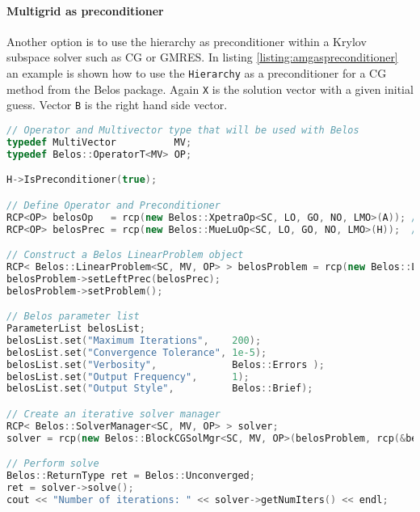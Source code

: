 \paragraph{Multigrid as preconditioner}
Another option is to use the \MueLu hierarchy as preconditioner within a Krylov subspace solver such as CG or GMRES. In listing \ref{listing:amgaspreconditioner} an example is shown how to use the \verb|Hierarchy| as a preconditioner for a CG method from the Belos package.
Again \verb|X| is the solution vector with a given initial guess. Vector \verb|B| is the right hand side vector.
\begin{Listing} 
\begin{center} 
\begin{lstlisting}[language=C++,label=listing:AmgAsPreconditioner]
// Operator and Multivector type that will be used with Belos
typedef MultiVector          MV;
typedef Belos::OperatorT<MV> OP;

H->IsPreconditioner(true);

// Define Operator and Preconditioner
RCP<OP> belosOp   = rcp(new Belos::XpetraOp<SC, LO, GO, NO, LMO>(A)); // Turns a Xpetra::Matrix object into a Belos operator
RCP<OP> belosPrec = rcp(new Belos::MueLuOp<SC, LO, GO, NO, LMO>(H));  // Turns a MueLu::Hierarchy object into a Belos operator

// Construct a Belos LinearProblem object
RCP< Belos::LinearProblem<SC, MV, OP> > belosProblem = rcp(new Belos::LinearProblem<SC, MV, OP>(belosOp, X, B));
belosProblem->setLeftPrec(belosPrec);
belosProblem->setProblem();

// Belos parameter list
ParameterList belosList;
belosList.set("Maximum Iterations",    200); 
belosList.set("Convergence Tolerance", 1e-5);   
belosList.set("Verbosity",             Belos::Errors );
belosList.set("Output Frequency",      1);
belosList.set("Output Style",          Belos::Brief);

// Create an iterative solver manager
RCP< Belos::SolverManager<SC, MV, OP> > solver;
solver = rcp(new Belos::BlockCGSolMgr<SC, MV, OP>(belosProblem, rcp(&belosList, false)));

// Perform solve
Belos::ReturnType ret = Belos::Unconverged;
ret = solver->solve();
cout << "Number of iterations: " << solver->getNumIters() << endl;
\end{lstlisting}
\caption{Use AMG as preconditioner within Belos.} 
\label{listing:amgaspreconditioner}
\end{center}
\end{Listing}

